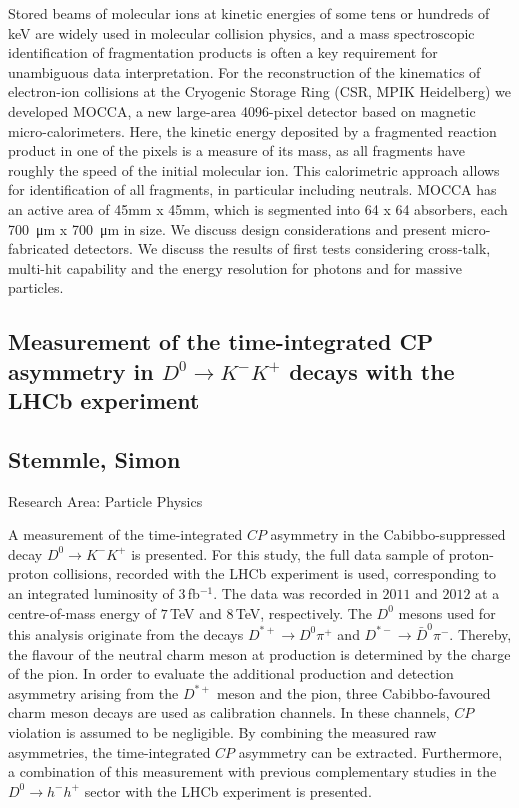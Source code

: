 \noindent Stored beams of molecular ions at kinetic energies of some tens or hundreds of keV are widely used in molecular collision physics, and a mass spectroscopic identification of fragmentation products is often a key requirement for unambiguous data interpretation. For the reconstruction of the kinematics of electron-ion collisions at the Cryogenic Storage Ring (CSR, MPIK Heidelberg) we developed MOCCA, a new large-area 4096-pixel detector based on magnetic micro-calorimeters. Here, the kinetic energy deposited by a fragmented reaction product in one of the pixels is a measure of its mass, as all fragments have roughly the speed of the initial molecular ion. This calorimetric approach allows for identification of all fragments, in particular including neutrals. MOCCA has an active area of 45mm x 45mm, which is segmented into 64 x 64 absorbers, each \SI{700}{\micro m} x \SI{700}{\micro m} in size.
\newline
We discuss design considerations and present micro-fabricated detectors. We discuss the results of first tests considering cross-talk, multi-hit capability and the energy resolution for photons and for massive particles.
\subsection*{\centering \large Measurement of the time-integrated CP asymmetry in $D^0\rightarrow K^-K^+$ decays with the LHCb experiment}
\subsection*{\centering \normalsize Stemmle, Simon}
Research Area: Particle Physics\newline

\noindent A measurement of the time-integrated $CP$ asymmetry in the Cabibbo-suppressed decay $D^0\rightarrow K^-K^+$ is presented. For this study, the full data sample of proton-proton collisions, recorded with the LHCb experiment is used, corresponding to an integrated luminosity of $3\,$fb$^{-1}$. The data was recorded in $2011$ and $2012$ at a centre-of-mass energy of $7\,$TeV and $8\,$TeV, respectively. The $D^0$ mesons used for this analysis originate from the decays $D^{*+}\rightarrow D^0\pi^+$ and $D^{*-}\rightarrow \bar{D}^0\pi^-$. Thereby, the flavour of the neutral charm meson at production is determined by the charge of the pion. In order to evaluate the additional production and detection asymmetry arising from the $D^{*+}$ meson and the pion, three Cabibbo-favoured charm meson decays are used as calibration channels. In these channels, $CP$ violation is assumed to be negligible. By combining the measured raw asymmetries, the time-integrated $CP$ asymmetry can be extracted. Furthermore, a combination of this measurement with previous complementary studies in the $D^0\rightarrow h^-h^+$ sector with the LHCb experiment is presented.
\newpage

